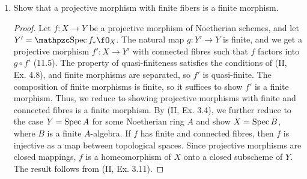 \documentclass[a4paper]{article}
\begin{document}
\begin{enumerate} [label=\textbf{\arabic*.}, leftmargin=0em]
    \item Show that a projective morphism with finite fibers is a finite morphism.

          \begin{proof}
              Let $f : X \to Y$ be a projective morphism of Noetherian schemes, and let $Y' = \rSpec{f_*\fO_X}$.
              The natural map $g : Y' \to Y$ is finite, and we get a projective morphism $f' : X \to Y'$ with connected fibres such that $f$ factors into $g \circ f'$ (11.5).
              The property of quasi-finiteness satisfies the conditions of (II, Ex. 4.8), and finite morphisms are separated, so $f'$ is quasi-finite.
              The composition of finite morphisms is finite, so it suffices to show $f'$ is a finite morphism.
              Thus, we reduce to showing projective morphisms with finite and connected fibres is a finite morphism.
              By (II, Ex. 3.4), we further reduce to the case $Y = \operatorname{Spec}{A}$ for some Noetherian ring $A$ and show $X = \operatorname{Spec}{B}$, where $B$ is a finite $A$-algebra.
              If $f$ has finite and connected fibres, then $f$ is injective as a map between topological spaces.
              Since projective morphisms are closed mappings, $f$ is a homeomorphism of $X$ onto a closed subscheme of $Y$.
              The result follows from (II, Ex. 3.11).
          \end{proof}






\end{enumerate}
\end{document}
